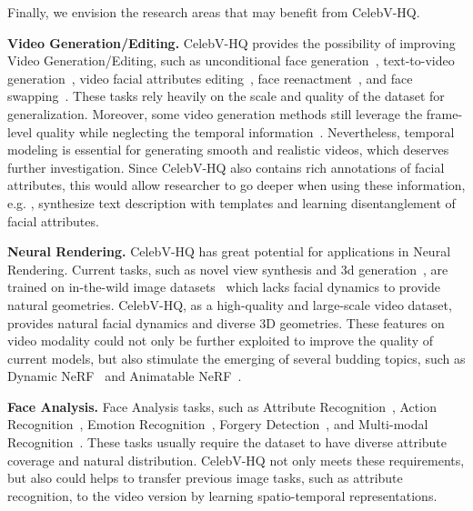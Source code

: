 \begin{sloppypar}

Finally, we envision the research areas that may benefit from CelebV-HQ. 

\textbf{Video Generation/Editing.} CelebV-HQ provides the possibility of improving Video Generation/Editing, such as unconditional face generation~\cite{gan,dcgan,stylegan,stylegan2,mocoganhd,digan,styleganv}, text-to-video generation~\cite{li2018video,nuwa,videodiffusion,cogvideo,text2live}, video facial attributes editing~\cite{starganv2,munit,interfacegan,e4e,xu2022transeditor}, face reenactment~\cite{wayne2018reenactgan,fomm,bilayermodel,wang2021facevid2vid}, and face swapping~\cite{li2019faceshifter,zhu2020aot,Gao_2021_CVPR,nirkin2019fsgan,xu2022mobilefaceswap}. These tasks rely heavily on the scale and quality of the dataset for generalization. Moreover, some video generation methods still leverage the frame-level quality while neglecting the temporal information~\cite{siarohin2021motion,wang2021one,Zhou_2021_CVPR}. Nevertheless, temporal modeling is essential for generating smooth and realistic videos, which deserves further investigation. Since CelebV-HQ also contains rich annotations of facial attributes, this would allow researcher to go deeper when using these information, e.g. , synthesize text description with templates and learning disentanglement of facial attributes.

\textbf{Neural Rendering.} CelebV-HQ has great potential for applications in Neural Rendering. Current tasks, such as novel view synthesis \cite{headnerf,stylenerf,or2021stylesdf,DBLP:journals/corr/abs-2204-11798,DBLP:journals/corr/abs-2201-07786} and 3d generation~\cite{chan2021pigan,or2021stylesdf,eg3d,guo2021adnerf,Gafni_2021_CVPR,chen2022sem2nerf}, are trained on in-the-wild image datasets~\cite{celebahq,stylegan} which lacks facial dynamics to provide natural geometries. CelebV-HQ, as a high-quality and large-scale video dataset, provides natural facial dynamics and diverse 3D geometries. These features on video modality could not only be further exploited to improve the quality of current models, but also stimulate the emerging of several budding topics, such as Dynamic NeRF~\cite{pumarola2021d} and Animatable NeRF~\cite{peng2021animatable}.

\textbf{Face Analysis.} Face Analysis tasks, such as Attribute Recognition~\cite{zhong2016face,ding2018deep,fairface}, Action Recognition~\cite{wang2013action,jegham2020vision}, Emotion Recognition~\cite{dzedzickis2020human,lee2019context}, Forgery Detection~\cite{li2020face,haliassos2021lips,zhu2021face}, and Multi-modal Recognition~\cite{zhang2020emotion,munro2020multi}. These tasks usually require the dataset to have diverse attribute coverage and natural distribution. CelebV-HQ not only meets these requirements, but also could helps to transfer previous image tasks, such as attribute recognition, to the video version by learning spatio-temporal representations. 
\end{sloppypar}

